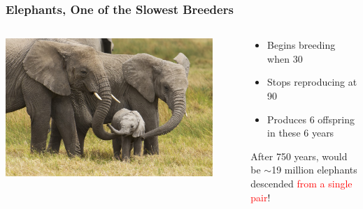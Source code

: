\documentclass[10pt]{beamer}
\begin{document}
\begin{frame}[t]
\frametitle{Elephants, One of the Slowest Breeders}
\vspace{0.5cm}

	\begin{columns}
		\begin{column}{0.5\textwidth}
			\begin{center}
				\includegraphics[width=0.9\textwidth]{figures/elephant.jpg}
			\end{center}
		\end{column}
		
		\begin{column}{0.5\textwidth}
			\begin{itemize}
				\item Begins breeding when 30
				\medskip
				\item Stops reproducing at 90
				\medskip
				\item Produces 6 offspring in these 6 years\\
				\bigskip
			\end{itemize}
			
			\begin{center}
				After 750 years, would be $\sim$19 million elephants descended \textcolor{red}{from a single pair}!
			\end{center}
		\end{column}
	\end{columns}
\end{frame}
\end{document}

